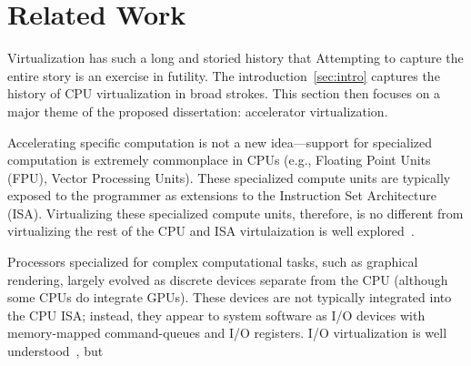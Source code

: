 \section{Related Work}
\label{sec:related}

Virtualization has such a long and storied history that Attempting to capture
the entire story is an exercise in futility. The introduction~\ref{sec:intro}
captures the history of CPU virtualization in broad strokes. This section then
focuses on a major theme of the proposed dissertation:
accelerator virtualization.

Accelerating specific computation is not a new idea---support for specialized
computation is extremely commonplace in CPUs (e.g., Floating Point Units
(FPU), Vector Processing Units). These specialized compute units are
typically exposed to the programmer as extensions to the Instruction Set
Architecture (ISA). Virtualizing these specialized compute units, therefore,
is no different from virtualizing the rest of the CPU and ISA virtulaization
is well explored~\cite{cp40,vm370,popek-goldberg,bugnion-disco,
bugnion-nieh-tsafrir,bugnion-workstation}.

Processors specialized for complex computational tasks, such as graphical
rendering, largely evolved as discrete devices separate from the CPU (although
some CPUs do integrate GPUs). These devices are not typically integrated into
the CPU ISA; instead, they appear to system software as I/O devices with
memory-mapped command-queues and I/O registers. I/O virtualization is well
understood~\cite{waldspurger12cacm,paradice,Kuperman_undated-io,Sig2010-ml,
zeng2013improved,abramson2006intel}, but







